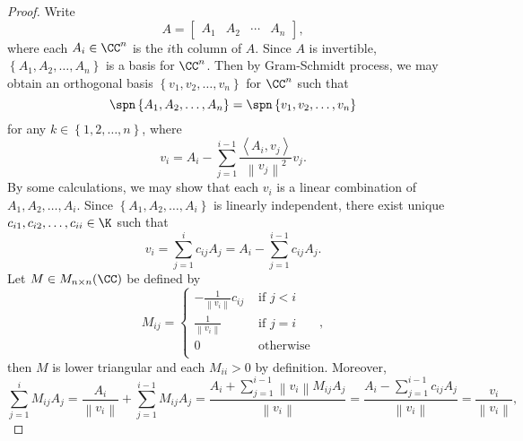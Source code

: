 \documentclass[linearalgebra]{subfiles}
\begin{document}
    \begin{proof}
        Write
        \begin{equation*}
            A =
            \begin{bmatrix}
                A_1 & A_2 & \cdots & A_n
            \end{bmatrix},
        \end{equation*}
        where each $A_i\in\CC^n$ is the $i$th column of $A$. Since $A$ is invertible, $\left\lbrace A_1,A_2,\ldots,A_n \right\rbrace$ is a basis for $\CC^n$. Then by Gram-Schmidt process, we may obtain an orthogonal basis $\left\lbrace v_1,v_2,\ldots,v_n \right\rbrace$ for $\CC^n$ such that
        \begin{equation*}
            \spn\left\lbrace A_1,A_2,\ldots,A_n \right\rbrace = \spn\left\lbrace v_1,v_2,\ldots,v_n \right\rbrace
        \end{equation*}
        for any $k\in\left\lbrace 1,2,\ldots,n \right\rbrace$, where
        \begin{equation*}
            v_i = A_i - \sum^{i-1}_{j=1} \frac{\left\langle A_i, v_j\right\rangle }{\left\lVert v_j\right\rVert ^2}v_j.
        \end{equation*}
        By some calculations, we may show that each $v_i$ is a linear combination of $A_1,A_2,\ldots,A_i$. Since $\left\lbrace A_1,A_2,\ldots,A_i \right\rbrace$ is linearly independent, there exist unique $c_{i1}, c_{i2}, \ldots, c_{ii}\in\K$ such that
        \begin{equation*}
            v_i = \sum^{i}_{j=1} c_{ij}A_j = A_i - \sum^{i-1}_{j=1} c_{ij}A_j.
        \end{equation*}
        Let $M\in M_{n\times n}(\CC)$ be defined by
        \begin{equation*}
            M_{ij} = 
            \begin{cases} 
                - \frac{1}{\left\lVert v_i\right\rVert }c_{ij} & \text{ if } j<i \\
                \frac{1}{\left\lVert v_i\right\rVert } & \text{ if } j=i \\
                0 & \text{ otherwise } \\
            \end{cases},
        \end{equation*}
        then $M$ is lower triangular and each $M_{ii} > 0$ by definition. Moreover,
        \begin{equation*}
            \sum^{i}_{j=1} M_{ij}A_j = \frac{A_i}{\left\lVert v_i\right\rVert } + \sum^{i-1}_{j=1} M_{ij}A_j = \frac{A_i + \sum^{i-1}_{j=1} \left\lVert v_i\right\rVert M_{ij}A_j}{\left\lVert v_i\right\rVert } = \frac{A_i-\sum^{i-1}_{j=1} c_{ij}A_j}{\left\lVert v_i\right\rVert } = \frac{v_i}{\left\lVert v_i\right\rVert },

\end{equation*}
\end{proof}
\end{document}

